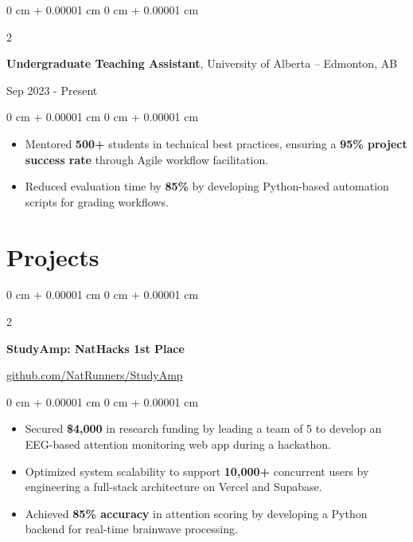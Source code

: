 \documentclass[10pt, letterpaper]{article}
\newenvironment{onecolentry}{
    \begin{adjustwidth}{
        0 cm + 0.00001 cm
    }{
        0 cm + 0.00001 cm
    }
}{
    \end{adjustwidth}
}
\newenvironment{twocolentry}[2][]{
    \onecolentry
    \def\secondColumn{#2}
    \setcolumnwidth{\fill, 6 cm}
    \begin{paracol}{2}
}{
    \switchcolumn \raggedleft \secondColumn
    \end{paracol}
    \endonecolentry
}
\begin{document}
    \vspace{0.10 cm}

    \begin{twocolentry}{Sep 2023 - Present}
        \textbf{Undergraduate Teaching Assistant}, University of Alberta -- Edmonton, AB
    \end{twocolentry}

   \vspace{0.10 cm}
    \begin{onecolentry}
        \begin{itemize}[leftmargin=2em, itemsep=1pt, parsep=0pt, topsep=0pt, partopsep=0pt]
            \item Mentored \textbf{500+} students in technical best practices, ensuring a \textbf{95\% project success rate} through Agile workflow facilitation.
            \item Reduced evaluation time by \textbf{85\%} by developing Python-based automation scripts for grading workflows.
        \end{itemize}
    \end{onecolentry}

    \vspace{0.10 cm}
    \section{Projects}

    \begin{twocolentry}{\href{https://github.com/NatRunners/StudyAmp}{github.com/NatRunners/StudyAmp}}
        \textbf{StudyAmp: NatHacks 1st Place}
    \end{twocolentry}

    \vspace{0.10 cm}
    \begin{onecolentry}
        \begin{itemize}[leftmargin=2em, itemsep=1pt, parsep=0pt, topsep=0pt, partopsep=0pt]
            \item Secured \textbf{\$4,000} in research funding by leading a team of 5 to develop an EEG-based attention monitoring web app during a hackathon.
            \item Optimized system scalability to support \textbf{10,000+} concurrent users by engineering a full-stack architecture on Vercel and Supabase.
            \item Achieved \textbf{85\% accuracy} in attention scoring by developing a Python backend for real-time brainwave processing.
        \end{itemize}
    \end{onecolentry}
\end{document}
